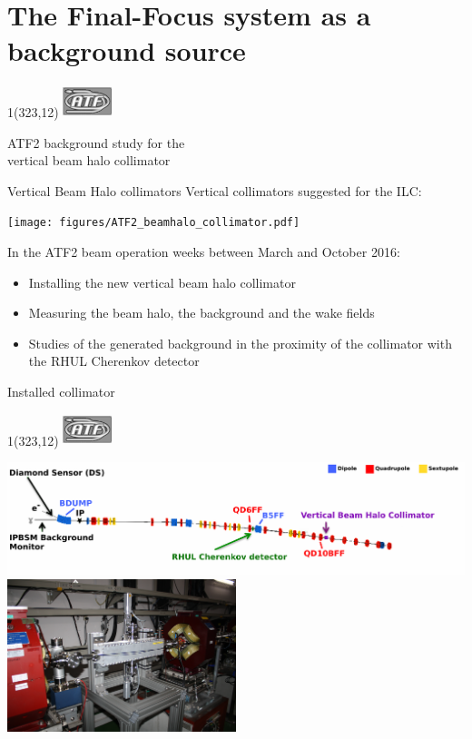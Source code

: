 \documentclass[xcolor={dvipsnames}]{beamer}
\newcommand{\ATFlogo}{
  \setlength{\TPHorizModule}{1pt}
  \setlength{\TPVertModule}{1pt}
  \begin{textblock}{1}(323,12)
   \includegraphics[width=40pt,height=26pt]{figures/ATF_logo.jpg}
  \end{textblock}
}
\begin{document}
\section{The Final-Focus system as a background source}
\begin{frame}
\ATFlogo
 \begin{center}
    \LARGE ATF2 background study for the\\vertical beam halo collimator
 \end{center}
\end{frame}

\begin{frame}{Vertical Beam Halo collimators}
Vertical collimators suggested for the ILC:\\
 \begin{center}
\texttt{[image: figures/ATF2\_beamhalo\_collimator.pdf]}
\end{center}
In the ATF2 beam operation weeks between March and October 2016:
\begin{itemize}
\item Installing the new vertical beam halo collimator
\item Measuring the beam halo, the background and the wake fields
\item Studies of the generated background in the proximity of the collimator with the RHUL Cherenkov detector
\end{itemize}

\end{frame}

\begin{frame}{Installed collimator}
\ATFlogo

\begin{center}
\includegraphics[width=\textwidth]{figures/ATF2schematic.pdf}\\
 \includegraphics[width=0.5\textwidth]{figures/Installed_Collimator.jpg}
\end{center}
\end{frame}
\end{document}
